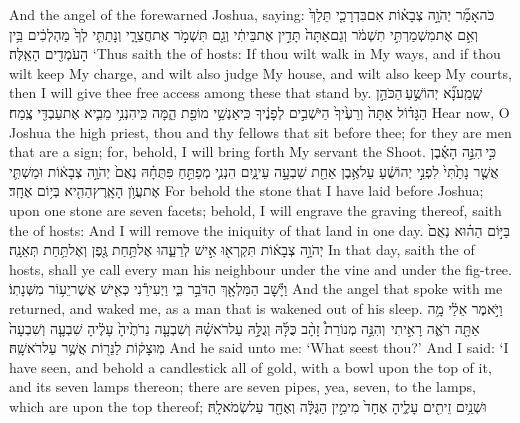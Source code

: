 \documentclass[11pt, openany]{book}
\begin{document}
{And the angel of the \lord\space forewarned Joshua, saying:}
{כֹּה\maqqaf אָמַ֞ר יְהֹוָ֣ה צְבָא֗וֹת אִם\maqqaf בִּדְרָכַ֤י תֵּלֵךְ֙ וְאִ֣ם אֶת\maqqaf מִשְׁמַרְתִּ֣י תִשְׁמֹ֔ר וְגַם\maqqaf אַתָּה֙ תָּדִ֣ין אֶת\maqqaf בֵּיתִ֔י וְגַ֖ם תִּשְׁמֹ֣ר אֶת\maqqaf חֲצֵרָ֑י וְנָתַתִּ֤י לְךָ֙ מַהְלְכִ֔ים בֵּ֥ין הָעֹמְדִ֖ים הָאֵֽלֶּה׃}
{‘Thus saith the \lord\space of hosts: If thou wilt walk in My ways, and if thou wilt keep My charge, and wilt also judge My house, and wilt also keep My courts, then I will give thee free access among these that stand by.}
{שְֽׁמַֽע\maqqaf נָ֞א יְהוֹשֻׁ֣עַ \legarmeh  הַכֹּהֵ֣ן הַגָּד֗וֹל אַתָּה֙ וְרֵעֶ֙יךָ֙ הַיֹּשְׁבִ֣ים לְפָנֶ֔יךָ כִּֽי\maqqaf אַנְשֵׁ֥י מוֹפֵ֖ת הֵ֑מָּה כִּֽי\maqqaf הִנְנִ֥י מֵבִ֛יא אֶת\maqqaf עַבְדִּ֖י צֶֽמַח׃}
{Hear now, O Joshua the high priest, thou and thy fellows that sit before thee; for they are men that are a sign; for, behold, I will bring forth My servant the Shoot.}
{כִּ֣י \legarmeh  הִנֵּ֣ה הָאֶ֗בֶן אֲשֶׁ֤ר נָתַ֙תִּי֙ לִפְנֵ֣י יְהוֹשֻׁ֔עַ עַל\maqqaf אֶ֥בֶן אַחַ֖ת שִׁבְעָ֣ה עֵינָ֑יִם הִנְנִ֧י מְפַתֵּ֣חַ פִּתֻּחָ֗הּ נְאֻם֙ יְהֹוָ֣ה צְבָא֔וֹת וּמַשְׁתִּ֛י אֶת\maqqaf עֲוֺ֥ן הָאָֽרֶץ\maqqaf הַהִ֖יא בְּי֥וֹם אֶחָֽד׃}
{For behold the stone that I have laid before Joshua; upon one stone are seven facets; behold, I will engrave the graving thereof, saith the \lord\space of hosts: And I will remove the iniquity of that land in one day.}
{בַּיּ֣וֹם הַה֗וּא נְאֻם֙ יְהֹוָ֣ה צְבָא֔וֹת תִּקְרְא֖וּ אִ֣ישׁ לְרֵעֵ֑הוּ אֶל\maqqaf תַּ֥חַת גֶּ֖פֶן וְאֶל\maqqaf תַּ֥חַת תְּאֵנָֽה׃}
{In that day, saith the \lord\space of hosts, shall ye call every man his neighbour under the vine and under the fig-tree.}
\newperek
{}
{וַיָּ֕שׇׁב הַמַּלְאָ֖ךְ הַדֹּבֵ֣ר בִּ֑י וַיְעִירֵ֕נִי כְּאִ֖ישׁ אֲשֶׁר\maqqaf יֵע֥וֹר מִשְּׁנָתֽוֹ׃}
{And the angel that spoke with me returned, and waked me, as a man that is wakened out of his sleep.}
{וַיֹּ֣אמֶר אֵלַ֔י מָ֥ה אַתָּ֖ה רֹאֶ֑ה  רָאִ֣יתִי \pasek  וְהִנֵּ֣ה מְנוֹרַת֩ זָהָ֨ב כֻּלָּ֜הּ וְגֻלָּ֣הּ עַל\maqqaf רֹאשָׁ֗הּ וְשִׁבְעָ֤ה נֵרֹתֶ֙יהָ֙ עָלֶ֔יהָ שִׁבְעָ֤ה וְשִׁבְעָה֙ מֽוּצָק֔וֹת לַנֵּר֖וֹת אֲשֶׁ֥ר עַל\maqqaf רֹאשָֽׁהּ׃}
{And he said unto me: ‘What seest thou?’ And I said: ‘I have seen, and behold a candlestick all of gold, with a bowl upon the top of it, and its seven lamps thereon; there are seven pipes, yea, seven, to the lamps, which are upon the top thereof;}
{וּשְׁנַ֥יִם זֵיתִ֖ים עָלֶ֑יהָ אֶחָד֙ מִימִ֣ין הַגֻּלָּ֔ה וְאֶחָ֖ד עַל\maqqaf שְׂמֹאלָֽהּ׃}
\end{document}
